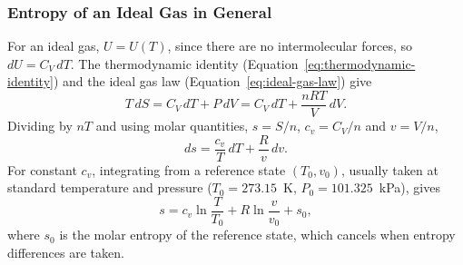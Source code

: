 \documentclass{article}
\begin{document}
\subsubsection{Entropy of an Ideal Gas in General}
For an ideal gas, $U = U(T)$, since there are no intermolecular forces, so $dU = C_V\,dT$. The thermodynamic identity (Equation~\eqref{eq:thermodynamic-identity}) and the ideal gas law (Equation~\eqref{eq:ideal-gas-law}) give
\[T\,dS = C_V\,dT + P\,dV = C_V\,dT + \frac{nRT}{V}\,dV.\]
Dividing by $nT$ and using molar quantities, $s = S/n$, $c_v = C_V/n$ and $v = V/n$,
\[ds = \frac{c_v}{T}\,dT + \frac{R}{v}\,dv.\]
For constant $c_v$, integrating from a reference state $(T_0, v_0)$, usually taken at standard temperature and pressure ($T_0 = 273.15$~K, $P_0 = 101.325$~kPa), gives
\begin{equation}
    \label{eq:ideal-gas-entropy}
    s = c_v\ln\frac{T}{T_0} + R\ln\frac{v}{v_0} + s_0,
\end{equation}
where $s_0$ is the molar entropy of the reference state, which cancels when entropy differences are taken.
\end{document}
